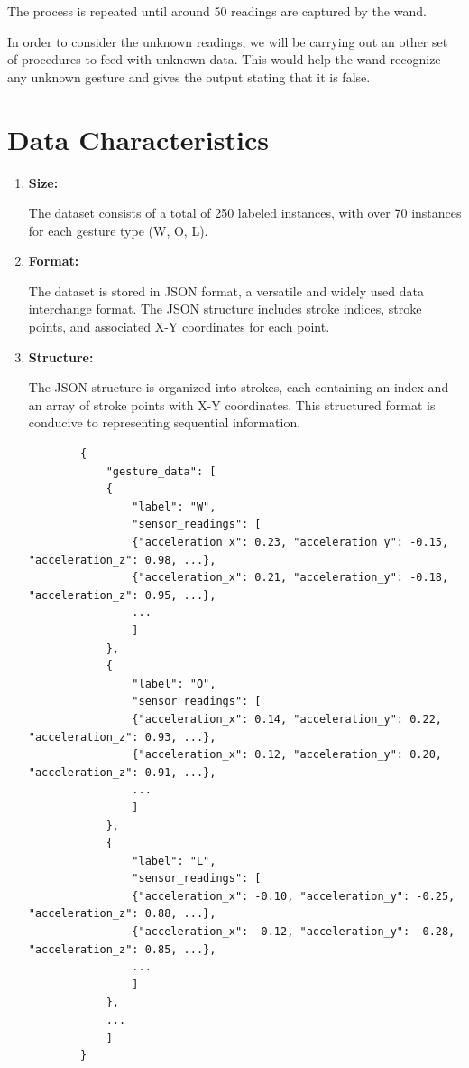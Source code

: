 The process is repeated until around 50 readings are captured by the wand.


\bigskip

In order to consider the unknown readings, we will be carrying out an other set of procedures to feed with unknown data. This would help the wand recognize any unknown gesture and gives the output stating that it is false. \cite{Warden:2020}



\section{Data Characteristics}

\begin{enumerate}
    
    \item \textbf{Size:}
    
    The dataset consists of a total of 250 labeled instances, with over 70 instances for each gesture type (W, O, L).
    
    \item \textbf{Format:}
    
    The dataset is stored in JSON format, a versatile and widely used data interchange format. The JSON structure includes stroke indices, stroke points, and associated X-Y coordinates for each point.
    
    \item \textbf{Structure:}
    
    The JSON structure is organized into strokes, each containing an index and an array of stroke points with X-Y coordinates. This structured format is conducive to representing sequential information.
    
    \begin{lstlisting}
        {
            "gesture_data": [
            {
                "label": "W",
                "sensor_readings": [
                {"acceleration_x": 0.23, "acceleration_y": -0.15, "acceleration_z": 0.98, ...},
                {"acceleration_x": 0.21, "acceleration_y": -0.18, "acceleration_z": 0.95, ...},
                ...
                ]
            },
            {
                "label": "O",
                "sensor_readings": [
                {"acceleration_x": 0.14, "acceleration_y": 0.22, "acceleration_z": 0.93, ...},
                {"acceleration_x": 0.12, "acceleration_y": 0.20, "acceleration_z": 0.91, ...},
                ...
                ]
            },
            {
                "label": "L",
                "sensor_readings": [
                {"acceleration_x": -0.10, "acceleration_y": -0.25, "acceleration_z": 0.88, ...},
                {"acceleration_x": -0.12, "acceleration_y": -0.28, "acceleration_z": 0.85, ...},
                ...
                ]
            },
            ...
            ]
        }
        

\end{lstlisting}
\end{enumerate}
